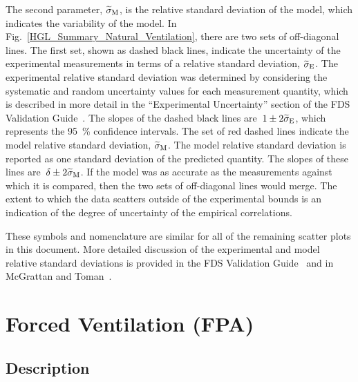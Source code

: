 The second parameter, $\widetilde{\sigma}\sb{M}$, is the relative standard deviation of the model, which indicates the variability of the model. In Fig.~\ref{HGL_Summary_Natural_Ventilation}, there are two sets of off-diagonal lines. The first set, shown as dashed black lines, indicate the uncertainty of the experimental measurements in terms of a relative standard deviation, $\widetilde{\sigma}\sb{E}$. The experimental relative standard deviation was determined by considering the systematic and random uncertainty values for each measurement quantity, which is described in more detail in the ``Experimental Uncertainty'' section of the FDS Validation Guide~\cite{FDS_Validation_Guide}. The slopes of the dashed black lines are~$1 \pm 2\widetilde{\sigma}\sb{E}$, which represents the \SI{95}{\percent} confidence intervals. The set of red dashed lines indicate the model relative standard deviation, $\widetilde{\sigma}\sb{M}$. The model relative standard deviation is reported as one standard deviation of the predicted quantity. The slopes of these lines are~$\delta \pm 2\widetilde{\sigma}\sb{M}$. If the model was as accurate as the measurements against which it is compared, then the two sets of off-diagonal lines would merge. The extent to which the data scatters outside of the experimental bounds is an indication of the degree of uncertainty of the empirical correlations.

These symbols and nomenclature are similar for all of the remaining scatter plots in this document. More detailed discussion of the experimental and model relative standard deviations is provided in the FDS Validation Guide~\cite{FDS_Validation_Guide} and in McGrattan and Toman~\cite{McGrattan:Metrologia}.


\clearpage


\section{Forced Ventilation (FPA)}
\label{sec:FPA}

\subsection*{Description}

